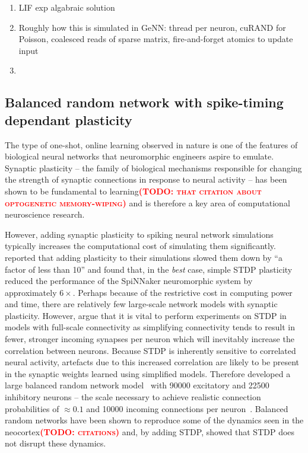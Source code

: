 \documentclass[utf8]{frontiersSCNS} %
\newcommand{\todo}[1]{\textbf{\textsc{\textcolor{red}{(TODO: #1)}}}}
\begin{document}
\begin{enumerate}
    \item LIF exp algabraic solution
    \item Roughly how this is simulated in GeNN: thread per neuron, cuRAND for Poisson, coalesced reads of sparse matrix, fire-and-forget atomics to update input
    \item 
\end{enumerate}

\subsection{Balanced random network with spike-timing dependant plasticity}
\label{sec:method/balanced_random}
The type of one-shot, online learning observed in nature is one of the features of biological neural networks that neuromorphic engineers aspire to emulate.
Synaptic plasticity -- the family of biological mechanisms responsible for changing the strength of synaptic connections in response to neural activity -- has been shown to be fundamental to learning\todo{that citation about optogenetic memory-wiping} and is therefore a key area of computational neuroscience research.

However, adding synaptic plasticity to spiking neural network simulations typically increases the computational cost of simulating them significantly. 
\citet{Morrison2007} reported that adding plasticity to their simulations slowed them down by ``a factor of less than 10'' and \citet{Knight2016b} found that, in the \textit{best} case, simple STDP plasticity reduced the performance of the SpiNNaker neuromorphic system by approximately $6\times$.
Perhaps because of the restrictive cost in computing power and time, there are relatively few large-scale network models with synaptic plasticity.
However, \citeauthor{Morrison2007} argue that it is vital to perform experiments on STDP in models with full-scale connectivity as simplifying connectivity tends to result in fewer, stronger incoming synapses per neuron which will inevitably increase the correlation between neurons.
Because STDP is inherently sensitive to correlated neural activity, artefacts due to this increased correlation are likely to be present in the synaptic weights learned using simplified models.
Therefore \citeauthor{Morrison2007} developed a large balanced random network model~\citep{Brunel2000} with \num{90000} excitatory and \num{22500} inhibitory neurons -- the scale necessary to achieve realistic connection probabilities of $\approx0.1$ and \num{10000} incoming connections per neuron~\citep{braitenberg2013cortex}.
Balanced random networks have been shown to reproduce some of the dynamics seen in the neocortex\todo{citations} and, by adding STDP, \citeauthor{Morrison2007} showed that STDP does not disrupt these dynamics.
\end{document}
